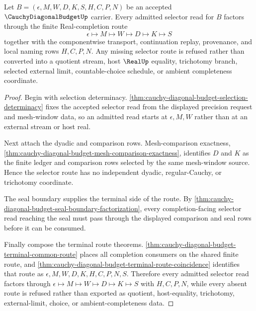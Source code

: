 \begin{theorem}
\label{thm:cauchy-diagonal-budget-selector-route-totality}
Let $B=(\epsilon,M,W,D,K,S,H,C,P,N)$ be an accepted $\CauchyDiagonalBudgetUp$ carrier. Every admitted selector read for $B$ factors through the finite Real-completion route
$$
\epsilon \longmapsto M \longmapsto W \longmapsto D \longmapsto K \longmapsto S
$$
together with the componentwise transport, continuation replay, provenance, and local naming rows $H,C,P,N$. Any missing selector route is refused rather than converted into a quotient stream, host $\RealUp$ equality, trichotomy branch, selected external limit, countable-choice schedule, or ambient completeness coordinate.
\end{theorem}
\begin{proof}
Begin with selection determinacy. \autoref{thm:cauchy-diagonal-budget-selection-determinacy} fixes the accepted selector read from the displayed precision request and mesh-window data, so an admitted read starts at $\epsilon,M,W$ rather than at an external stream or host real.

Next attach the dyadic and comparison rows. Mesh-comparison exactness, \autoref{thm:cauchy-diagonal-budget-mesh-comparison-exactness}, identifies $D$ and $K$ as the finite ledger and comparison rows selected by the same mesh-window source. Hence the selector route has no independent dyadic, regular-Cauchy, or trichotomy coordinate.

The seal boundary supplies the terminal side of the route. By \autoref{thm:cauchy-diagonal-budget-seal-boundary-factorization}, every completion-facing selector read reaching the seal must pass through the displayed comparison and seal rows before it can be consumed.

Finally compose the terminal route theorems. \autoref{thm:cauchy-diagonal-budget-terminal-common-route} places all completion consumers on the shared finite route, and \autoref{thm:cauchy-diagonal-budget-terminal-route-coincidence} identifies that route as $\epsilon,M,W,D,K,H,C,P,N,S$. Therefore every admitted selector read factors through $\epsilon \longmapsto M \longmapsto W \longmapsto D \longmapsto K \longmapsto S$ with $H,C,P,N$, while every absent route is refused rather than exported as quotient, host-equality, trichotomy, external-limit, choice, or ambient-completeness data.
\end{proof}

